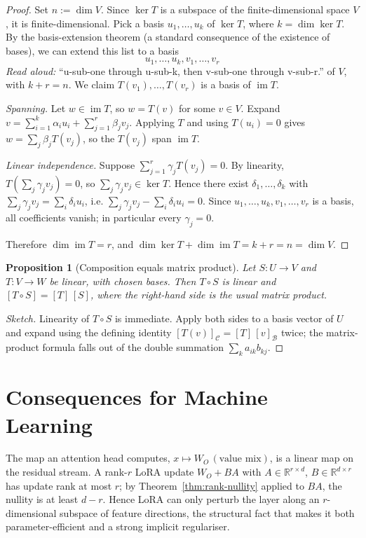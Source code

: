 \documentclass[11pt]{article}
\theoremstyle{plain}
\newtheorem{proposition}[theorem]{Proposition}
\theoremstyle{definition}
\DeclareMathOperator{\im}{im}
\begin{document}
\begin{proof}
Set $n := \dim V$. Since $\ker T$ is a subspace of the finite-dimensional
space $V$, it is finite-dimensional. Pick a basis $u_1, \dots, u_k$ of
$\ker T$, where $k = \dim \ker T$. By the basis-extension theorem (a
standard consequence of the existence of bases), we can extend this list to
a basis
\[
u_1, \dots, u_k, v_1, \dots, v_r
\]
\emph{Read aloud:} ``u-sub-one through u-sub-k, then v-sub-one through v-sub-r.''
of $V$, with $k + r = n$. We claim $T(v_1), \dots, T(v_r)$ is a basis of
$\im T$.

\emph{Spanning.} Let $w \in \im T$, so $w = T(v)$ for some $v \in V$.
Expand $v = \sum_{i=1}^k \alpha_i u_i + \sum_{j=1}^r \beta_j v_j$. Applying
$T$ and using $T(u_i) = 0$ gives $w = \sum_j \beta_j T(v_j)$, so the
$T(v_j)$ span $\im T$.

\emph{Linear independence.} Suppose
$\sum_{j=1}^r \gamma_j T(v_j) = 0$. By linearity,
$T\!\left( \sum_j \gamma_j v_j \right) = 0$, so
$\sum_j \gamma_j v_j \in \ker T$. Hence there exist
$\delta_1, \dots, \delta_k$ with
$\sum_j \gamma_j v_j = \sum_i \delta_i u_i$, i.e.
$\sum_j \gamma_j v_j - \sum_i \delta_i u_i = 0$. Since
$u_1, \dots, u_k, v_1, \dots, v_r$ is a basis, all coefficients vanish; in
particular every $\gamma_j = 0$.

Therefore $\dim \im T = r$, and
$\dim \ker T + \dim \im T = k + r = n = \dim V$.
\end{proof}

\begin{proposition}[Composition equals matrix product]
Let $S \colon U \to V$ and $T \colon V \to W$ be linear, with chosen bases.
Then $T \circ S$ is linear and
$[T \circ S] = [T] \, [S]$, where the right-hand side is the usual matrix
product.
\end{proposition}

\begin{proof}[Sketch]
Linearity of $T \circ S$ is immediate. Apply both sides to a basis vector of
$U$ and expand using the defining identity
$[T(v)]_{\mathcal{C}} = [T]\,[v]_{\mathcal{B}}$ twice; the matrix-product
formula falls out of the double summation $\sum_k a_{ik} b_{kj}$.
\end{proof}

\section{Consequences for Machine Learning}

The map an attention head computes, $x \mapsto W_O\,(\text{value mix})$, is
a linear map on the residual stream. A rank-$r$ LoRA update $W_O + BA$ with
$A \in \mathbb{R}^{r \times d}$, $B \in \mathbb{R}^{d \times r}$ has update
rank at most $r$; by Theorem~\ref{thm:rank-nullity} applied to $BA$, the
nullity is at least $d - r$. Hence LoRA can only perturb the layer along
an $r$-dimensional subspace of feature directions, the structural fact that
makes it both parameter-efficient and a strong implicit regulariser.
\end{document}
